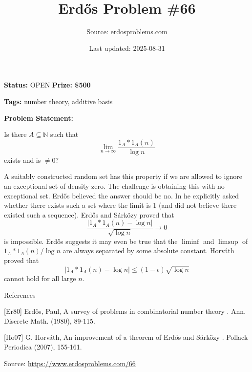 \documentclass{article}
\title{Erd\H{o}s Problem \#66}
\date{Last updated: 2025-08-31}
\author{Source: erdosproblems.com}
\begin{document}
\maketitle

\noindent\textbf{Status:} OPEN \quad \textbf{Prize: \$500}

\noindent\textbf{Tags:} number theory, additive basis

\medskip

\noindent\textbf{Problem Statement:}

Is there $A\subseteq \mathbb{N}$ such that\[\lim_{n\to \infty}\frac{1_A\ast 1_A(n)}{\log n}\]exists and is $\neq 0$?




A suitably constructed random set has this property if we are allowed to ignore an exceptional set of density zero. The challenge is obtaining this with no exceptional set. Erd\H{o}s believed the answer should be no. In \cite{Er80} he explicitly asked whether there exists such a set where the limit is $1$ (and did not believe there existed such a sequence). Erd\H{o}s and S\'{a}rk\"{o}zy proved that\[\frac{\lvert 1_A\ast 1_A(n)-\log n\rvert}{\sqrt{\log n}}\to 0\]is impossible. Erd\H{o}s suggests it may even be true that the $\liminf$ and $\limsup$ of $1_A\ast 1_A(n)/\log n$ are always separated by some absolute constant. Horv\'{a}th \cite{Ho07} proved that\[\lvert 1_A\ast 1_A(n)-\log n\rvert \leq (1-\epsilon)\sqrt{\log n}\]cannot hold for all large $n$.




References

[Er80] Erd\H{o}s, Paul, A survey of problems in combinatorial number theory . Ann. Discrete Math. (1980), 89-115.

[Ho07] G. Horv\'{a}th, An improvement of a theorem of Erd\H{o}s and S\'{a}rk\"{o}zy . Pollack Periodica (2007), 155-161.


\bigskip
\noindent\small{Source: \url{https://www.erdosproblems.com/66}}
\end{document}
